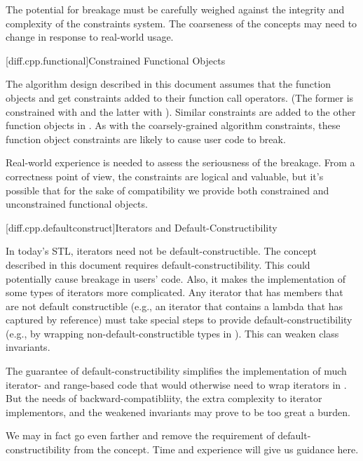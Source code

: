 \pnum
The potential for breakage must be carefully weighed against the integrity and complexity of the
constraints system. The coarseness of the concepts may need to change in response to real-world
usage.

[diff.cpp.functional]{Constrained Functional Objects}

\pnum
The algorithm design described in this document assumes that the function objects
 and  get constraints added to their function call operators.
(The former is constrained with  and the latter with
). Similar constraints are added to the other function objects
in .  As with the
coarsely-grained algorithm constraints, these function object constraints are likely to cause
user code to break.

\pnum
Real-world experience is needed to assess the seriousness of the breakage. From a correctness point
of view, the constraints are logical and valuable, but it's possible that for the sake of
compatibility we provide both constrained and unconstrained functional objects.

[diff.cpp.defaultconstruct]{Iterators and Default-Constructibility}

\pnum
In today's STL, iterators need not be default-constructible. The  concept described
in this document requires default-constructibility. This could potentially cause breakage in users'
code. Also, it makes the implementation of some types of iterators more complicated. Any iterator
that has members that are not default constructible (e.g., an iterator that contains a lambda that
has captured by reference) must take special steps to provide default-constructibility (e.g.,
by wrapping non-default-constructible types in ). This can weaken class
invariants.

\pnum
The guarantee of default-constructibility simplifies the implementation of much iterator- and
range-based code that would otherwise need to wrap iterators in . But the
needs of backward-compatibliity, the extra complexity to iterator implementors, and the weakened
invariants may prove to be too great a burden.

\pnum
We may in fact go even farther and remove the requirement of default-constructibility from the
 concept. Time and experience will give us guidance here.

